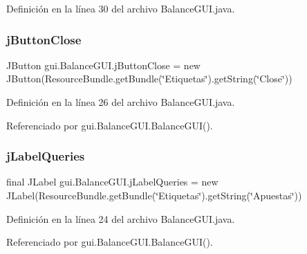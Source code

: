 Definición en la línea 30 del archivo Balance\+G\+U\+I.\+java.

\mbox{\label{classgui_1_1BalanceGUI_a70e391817059e3df5063ce0fbb81bea7}} 
\subsubsection{\texorpdfstring{jButtonClose}{jButtonClose}}
{\footnotesize\ttfamily J\+Button gui.\+Balance\+G\+U\+I.\+j\+Button\+Close = new J\+Button(Resource\+Bundle.\+get\+Bundle(\char`\"{}Etiquetas\char`\"{}).get\+String(\char`\"{}Close\char`\"{}))\hspace{0.3cm}{\ttfamily [private]}}



Definición en la línea 26 del archivo Balance\+G\+U\+I.\+java.



Referenciado por gui.\+Balance\+G\+U\+I.\+Balance\+G\+U\+I().

\mbox{\label{classgui_1_1BalanceGUI_a956dfe547a0eefc511a0c8de0a528bda}} 
\subsubsection{\texorpdfstring{jLabelQueries}{jLabelQueries}}
{\footnotesize\ttfamily final J\+Label gui.\+Balance\+G\+U\+I.\+j\+Label\+Queries = new J\+Label(Resource\+Bundle.\+get\+Bundle(\char`\"{}Etiquetas\char`\"{}).get\+String(\char`\"{}Apuestas\char`\"{}))\hspace{0.3cm}{\ttfamily [private]}}



Definición en la línea 24 del archivo Balance\+G\+U\+I.\+java.



Referenciado por gui.\+Balance\+G\+U\+I.\+Balance\+G\+U\+I().

\mbox{\label{classgui_1_1BalanceGUI_abc9c078eacbdf6bfd4538b6a855ab906}} 
